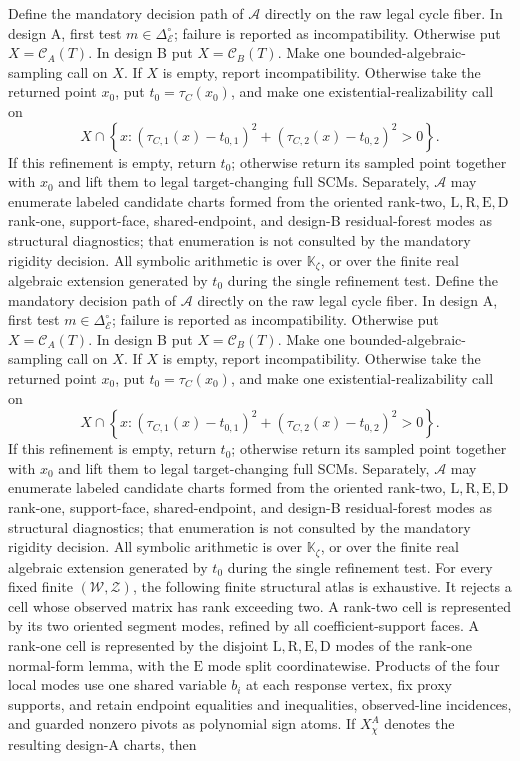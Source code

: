 Define the mandatory decision path of \(\mathscr A\) directly on the raw legal cycle fiber.  In design A, first test \(m\in\Delta_{\mathcal E}^{\circ}\); failure is reported as incompatibility.  Otherwise put \(X=\mathcal C_A(T)\).  In design B put \(X=\mathcal C_B(T)\).  Make one bounded-algebraic-sampling call on \(X\).  If \(X\) is empty, report incompatibility.  Otherwise take the returned point \(x_0\), put \(t_0=\tau_C(x_0)\), and make one existential-realizability call on
\[
X\cap\left\{x:
(\tau_{C,1}(x)-t_{0,1})^2+(\tau_{C,2}(x)-t_{0,2})^2>0
\right\}.
\]
If this refinement is empty, return \(t_0\); otherwise return its sampled point together with \(x_0\) and lift them to legal target-changing full SCMs.  Separately, \(\mathscr A\) may enumerate labeled candidate charts formed from the oriented rank-two, \(\mathrm L,\mathrm R,\mathrm E,\mathrm D\) rank-one, support-face, shared-endpoint, and design-B residual-forest modes as structural diagnostics; that enumeration is not consulted by the mandatory rigidity decision.  All symbolic arithmetic is over \(\mathbb K_{\zeta}\), or over the finite real algebraic extension generated by \(t_0\) during the single refinement test.
Define the mandatory decision path of \(\mathscr A\) directly on the raw legal cycle fiber.  In design A, first test \(m\in\Delta_{\mathcal E}^{\circ}\); failure is reported as incompatibility.  Otherwise put \(X=\mathcal C_A(T)\).  In design B put \(X=\mathcal C_B(T)\).  Make one bounded-algebraic-sampling call on \(X\).  If \(X\) is empty, report incompatibility.  Otherwise take the returned point \(x_0\), put \(t_0=\tau_C(x_0)\), and make one existential-realizability call on
\[
X\cap\left\{x:
(\tau_{C,1}(x)-t_{0,1})^2+(\tau_{C,2}(x)-t_{0,2})^2>0
\right\}.
\]
If this refinement is empty, return \(t_0\); otherwise return its sampled point together with \(x_0\) and lift them to legal target-changing full SCMs.  Separately, \(\mathscr A\) may enumerate labeled candidate charts formed from the oriented rank-two, \(\mathrm L,\mathrm R,\mathrm E,\mathrm D\) rank-one, support-face, shared-endpoint, and design-B residual-forest modes as structural diagnostics; that enumeration is not consulted by the mandatory rigidity decision.  All symbolic arithmetic is over \(\mathbb K_{\zeta}\), or over the finite real algebraic extension generated by \(t_0\) during the single refinement test.
For every fixed finite \((\mathcal W,\mathcal Z)\), the following finite structural atlas is exhaustive.  It rejects a cell whose observed matrix has rank exceeding two.  A rank-two cell is represented by its two oriented segment modes, refined by all coefficient-support faces.  A rank-one cell is represented by the disjoint \(\mathrm L,\mathrm R,\mathrm E,\mathrm D\) modes of the rank-one normal-form lemma, with the \(\mathrm E\) mode split coordinatewise.  Products of the four local modes use one shared variable \(b_i\) at each response vertex, fix proxy supports, and retain endpoint equalities and inequalities, observed-line incidences, and guarded nonzero pivots as polynomial sign atoms.  If \(X^A_\chi\) denotes the resulting design-A charts, then
